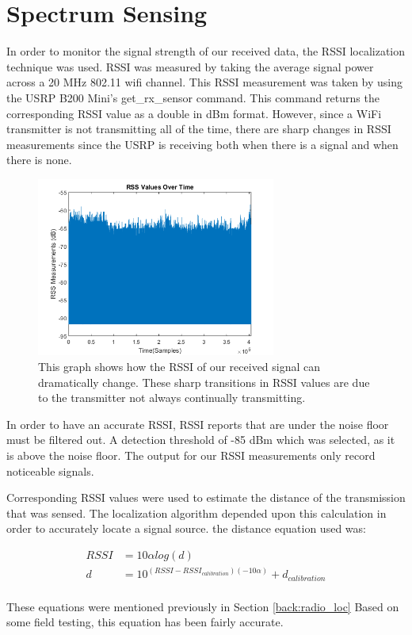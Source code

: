 \section{Spectrum Sensing}

In order to monitor the signal strength of our received data, the RSSI localization technique was used. RSSI was measured by taking the average signal power across a 20 MHz 802.11 wifi channel. This RSSI measurement was taken by using the USRP B200 Mini’s get\_rx\_sensor command.  This command returns the corresponding RSSI value as a double in dBm format.  However, since a WiFi transmitter is not transmitting all of the time, there are sharp changes in RSSI measurements since the USRP is receiving both when there is a signal and when there is none.

\begin{figure}[h!]
	\centering
	\includegraphics[width=0.70\textwidth]{img/rss_vals_test.png}
	\caption{This graph shows how the RSSI of our received signal can dramatically change.  These sharp transitions in RSSI values are due to the transmitter not always continually transmitting.}
	\label{fig:rss_values}
\end{figure}
In order to have an accurate RSSI, RSSI reports that are under the noise floor must be filtered out. A detection threshold of -85 dBm which was selected, as it is above the noise floor.  The output for our RSSI measurements only record noticeable signals.  

Corresponding RSSI values were used to estimate the distance of the transmission that was sensed.  The localization algorithm depended upon this calculation in order to accurately locate a signal source. the distance equation used was:

 \begin{align}
\label{eq:rss} RSSI &= 10\alpha log(d) \\ 
d &= 10^{(RSSI-RSSI_{calibration})(-10\alpha)} + d_{calibration} \label{eq:rss_dist}
\end{align}\\
These equations were mentioned previously in Section \ref{back:radio_loc}
Based on some field testing, this equation has been fairly accurate.\par

